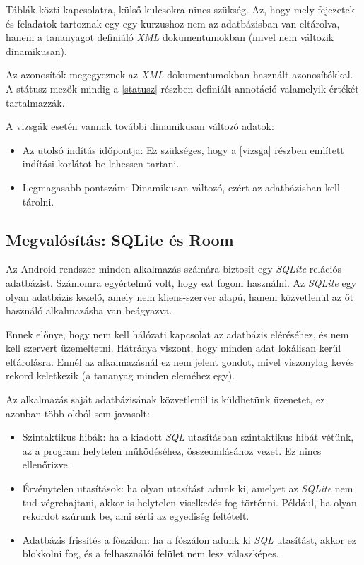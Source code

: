 \documentclass[12pt,a4paper]{article}
\newcommand{\xml}{\textit{XML}\xspace}
\begin{document}
	Táblák közti kapcsolatra, külső kulcsokra nincs szükség. Az, hogy mely fejezetek és feladatok tartoznak egy-egy kurzushoz nem az adatbázisban van eltárolva, hanem a tananyagot definiáló \xml dokumentumokban (mivel nem változik dinamikusan).
	
	Az azonosítók megegyeznek az \xml dokumentumokban használt azonosítókkal. A státusz mezők mindig a \ref{statusz} részben definiált annotáció valamelyik értékét tartalmazzák.
	
	A vizsgák esetén vannak további dinamikusan változó adatok:
	
	\begin{itemize}
		\item Az utolsó indítás időpontja: Ez szükséges, hogy a \ref{vizsga} részben említett indítási korlátot be lehessen tartani.
		\item Legmagasabb pontszám: Dinamikusan változó, ezért az adatbázisban kell tárolni.
	\end{itemize}
	
	\subsection{Megvalósítás: SQLite és Room}\label{sqlite_roon}

	Az Android rendszer minden alkalmazás számára biztosít egy \textit{SQLite} relációs adatbázist. Számomra egyértelmű volt, hogy ezt fogom használni. Az \textit{SQLite} egy olyan adatbázis kezelő, amely nem kliens-szerver alapú, hanem közvetlenül az őt használó alkalmazásba van beágyazva. 
	
	Ennek előnye, hogy nem kell hálózati kapcsolat az adatbázis eléréséhez, és nem kell szervert üzemeltetni. Hátránya viszont, hogy minden adat lokálisan kerül eltárolásra. Ennél az alkalmazásnál ez nem jelent gondot, mivel viszonylag kevés rekord keletkezik (a tananyag minden eleméhez egy).
	
	Az alkalmazás saját adatbázisának közvetlenül is küldhetünk üzenetet, ez azonban több okból sem javasolt:
	
	\begin{itemize}
		\item Szintaktikus hibák: ha a kiadott \textit{SQL} utasításban szintaktikus hibát vétünk, az a program helytelen működéséhez, összeomlásához vezet. Ez nincs ellenőrizve.
		\item Érvénytelen utasítások: ha olyan utasítást adunk ki, amelyet az \textit{SQLite} nem tud végrehajtani, akkor is helytelen viselkedés fog történni. Például, ha olyan rekordot szúrunk be, ami sérti az egyediség feltételt.
		\item Adatbázis frissítés a főszálon: ha a főszálon adunk ki \textit{SQL} utasítást, akkor ez blokkolni fog, és a felhasználói felület nem lesz válaszképes. 
	\end{itemize}
\end{document}
